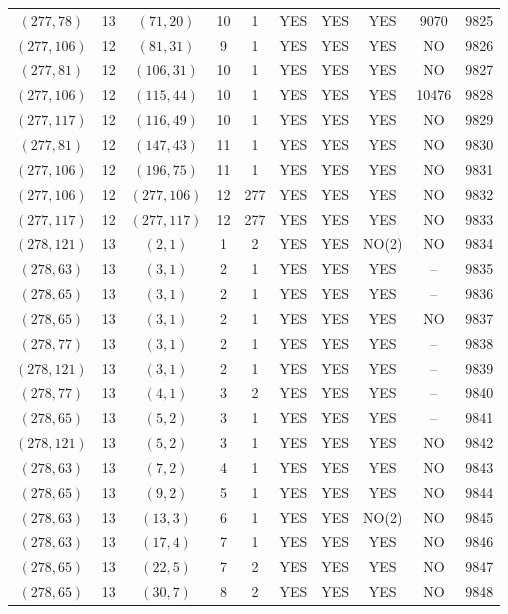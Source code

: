 \begin{longtable}{|c|c|c|c|c|c|c|c|c|c|}
$(277, 78)$ & 13 & $(71, 20)$ & 10 & 1 & YES & YES & YES & 9070 & 9825\\
$(277, 106)$ & 12 & $(81, 31)$ & 9 & 1 & YES & YES & YES & NO & 9826\\
$(277, 81)$ & 12 & $(106, 31)$ & 10 & 1 & YES & YES & YES & NO & 9827\\
$(277, 106)$ & 12 & $(115, 44)$ & 10 & 1 & YES & YES & YES & 10476 & 9828\\
$(277, 117)$ & 12 & $(116, 49)$ & 10 & 1 & YES & YES & YES & NO & 9829\\
$(277, 81)$ & 12 & $(147, 43)$ & 11 & 1 & YES & YES & YES & NO & 9830\\
$(277, 106)$ & 12 & $(196, 75)$ & 11 & 1 & YES & YES & YES & NO & 9831\\
$(277, 106)$ & 12 & $(277, 106)$ & 12 & 277 & YES & YES & YES & NO & 9832\\
$(277, 117)$ & 12 & $(277, 117)$ & 12 & 277 & YES & YES & YES & NO & 9833\\
$(278, 121)$ & 13 & $(2, 1)$ & 1 & 2 & YES & YES & NO(2) & NO & 9834\\
$(278, 63)$ & 13 & $(3, 1)$ & 2 & 1 & YES & YES & YES & -- & 9835\\
$(278, 65)$ & 13 & $(3, 1)$ & 2 & 1 & YES & YES & YES & -- & 9836\\
$(278, 65)$ & 13 & $(3, 1)$ & 2 & 1 & YES & YES & YES & NO & 9837\\
$(278, 77)$ & 13 & $(3, 1)$ & 2 & 1 & YES & YES & YES & -- & 9838\\
$(278, 121)$ & 13 & $(3, 1)$ & 2 & 1 & YES & YES & YES & -- & 9839\\
$(278, 77)$ & 13 & $(4, 1)$ & 3 & 2 & YES & YES & YES & -- & 9840\\
$(278, 65)$ & 13 & $(5, 2)$ & 3 & 1 & YES & YES & YES & -- & 9841\\
$(278, 121)$ & 13 & $(5, 2)$ & 3 & 1 & YES & YES & YES & NO & 9842\\
$(278, 63)$ & 13 & $(7, 2)$ & 4 & 1 & YES & YES & YES & NO & 9843\\
$(278, 65)$ & 13 & $(9, 2)$ & 5 & 1 & YES & YES & YES & NO & 9844\\
$(278, 63)$ & 13 & $(13, 3)$ & 6 & 1 & YES & YES & NO(2) & NO & 9845\\
$(278, 63)$ & 13 & $(17, 4)$ & 7 & 1 & YES & YES & YES & NO & 9846\\
$(278, 65)$ & 13 & $(22, 5)$ & 7 & 2 & YES & YES & YES & NO & 9847\\
$(278, 65)$ & 13 & $(30, 7)$ & 8 & 2 & YES & YES & YES & NO & 9848\\

\end{longtable}
